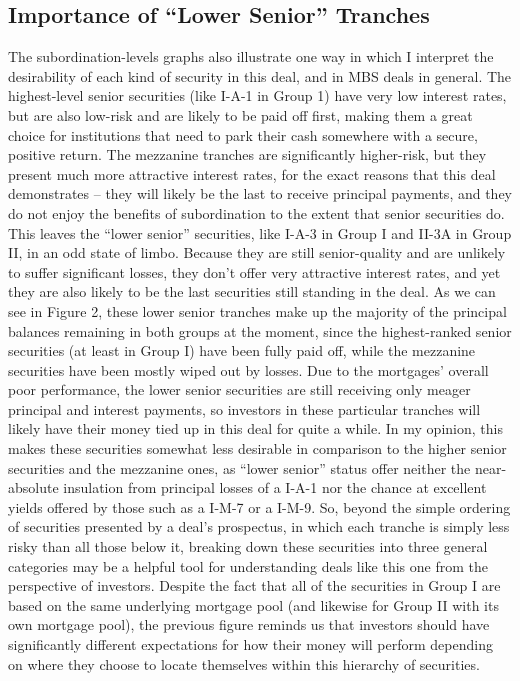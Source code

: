 \documentclass[12pt]{article}
\begin{document}
\subsection*{Importance of ``Lower Senior'' Tranches}

The subordination-levels graphs also illustrate one way in which I interpret the desirability of each kind of security in this deal, and in MBS deals in general. The highest-level senior securities (like I-A-1 in Group 1) have very low interest rates, but are also low-risk and are likely to be paid off first, making them a great choice for institutions that need to park their cash somewhere with a secure, positive return. The mezzanine tranches are significantly higher-risk, but they present much more attractive interest rates, for the exact reasons that this deal demonstrates – they will likely be the last to receive principal payments, and they do not enjoy the benefits of subordination to the extent that senior securities do. This leaves the “lower senior” securities, like I-A-3 in Group I and II-3A in Group II, in an odd state of limbo. Because they are still senior-quality and are unlikely to suffer significant losses, they don’t offer very attractive interest rates, and yet they are also likely to be the last securities still standing in the deal. As we can see in Figure 2, these lower senior tranches make up the majority of the principal balances remaining in both groups at the moment, since the highest-ranked senior securities (at least in Group I) have been fully paid off, while the mezzanine securities have been mostly wiped out by losses. Due to the mortgages’ overall poor performance, the lower senior securities are still receiving only meager principal and interest payments, so investors in these particular tranches will likely have their money tied up in this deal for quite a while. In my opinion, this makes these securities somewhat less desirable in comparison to the higher senior securities and the mezzanine ones, as “lower senior” status offer neither the near-absolute insulation from principal losses of a I-A-1 nor the chance at excellent yields offered by those such as a I-M-7 or a I-M-9. So, beyond the simple ordering of securities presented by a deal’s prospectus, in which each tranche is simply less risky than all those below it, breaking down these securities into three general categories may be a helpful tool for understanding deals like this one from the perspective of investors. Despite the fact that all of the securities in Group I are based on the same underlying mortgage pool (and likewise for Group II with its own mortgage pool), the previous figure reminds us that investors should have significantly different expectations for how their money will perform depending on where they choose to locate themselves within this hierarchy of securities.
\end{document}
